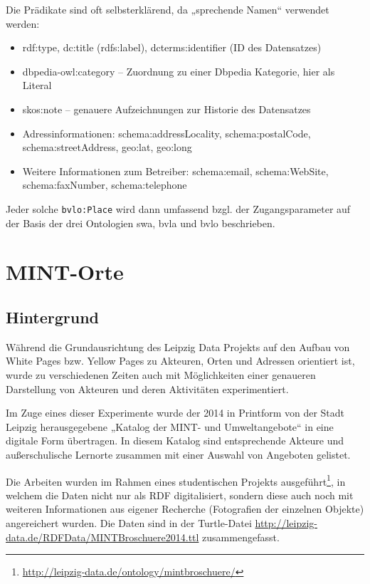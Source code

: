 \documentclass[a4paper,11pt]{article}
\begin{document}
Die Prädikate sind oft selbsterklärend, da „sprechende Namen“ verwendet werden:
\begin{itemize}
\item rdf:type, dc:title (rdfs:label), dcterms:identifier (ID des Datensatzes)
\item dbpedia-owl:category -- Zuordnung zu einer Dbpedia Kategorie, hier als
  Literal 
\item skos:note -- genauere Aufzeichnungen zur Historie des Datensatzes
\item Adressinformationen: schema:addressLocality,
  schema:postalCode,\\ schema:streetAddress, geo:lat, geo:long
\item Weitere Informationen zum Betreiber: schema:email, schema:WebSite,\\
  schema:faxNumber, schema:telephone
\end{itemize}
Jeder solche \texttt{bvlo:Place} wird dann umfassend bzgl. der Zugangsparameter
auf der Basis der drei Ontologien swa, bvla und bvlo beschrieben.
\newpage

\section{MINT-Orte}

\subsection{Hintergrund}
Während die Grundausrichtung des Leipzig Data Projekts auf den Aufbau von White
Pages bzw. Yellow Pages zu Akteuren, Orten und Adressen orientiert ist, wurde
zu verschiedenen Zeiten auch mit Möglichkeiten einer genaueren Darstellung von
Akteuren und deren Aktivitäten experimentiert.

Im Zuge eines dieser Experimente wurde der 2014 in Printform von der Stadt
Leipzig herausgegebene „Katalog der MINT- und Umweltangebote“ in eine digitale
Form übertragen. In diesem Katalog sind entsprechende Akteure und
außerschulische Lernorte zusammen mit einer Auswahl von Angeboten gelistet.

Die Arbeiten wurden im Rahmen eines studentischen Projekts
ausgeführt\footnote{\url{http://leipzig-data.de/ontology/mintbroschuere/}}, in
welchem die Daten nicht nur als RDF digitalisiert, sondern diese auch noch mit
weiteren Informationen aus eigener Recherche (Fotografien der einzelnen
Objekte) angereichert wurden. Die Daten sind in der Turtle-Datei
\url{http://leipzig-data.de/RDFData/MINTBroschuere2014.ttl} zusammengefasst.
\end{document}
